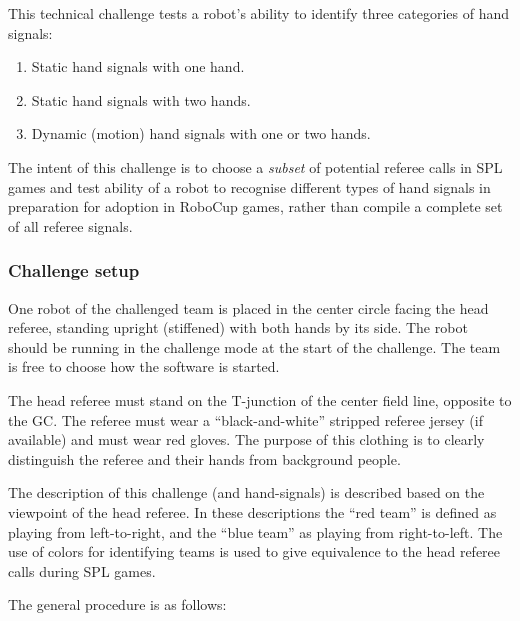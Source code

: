         This technical challenge tests a robot's ability to identify three categories of hand signals:
        \begin{enumerate}
            \item Static hand signals with one hand.
            \item Static hand signals with two hands.
            \item Dynamic (motion) hand signals with one or two hands.
        \end{enumerate}
        
        The intent of this challenge is to choose a \emph{subset} of potential referee calls in SPL games and test ability of a robot to recognise different types of hand signals in preparation for adoption in RoboCup games, rather than compile a complete set of all referee signals.

    \subsubsection{Challenge setup}

        One robot of the challenged team is placed in the center circle facing the head referee, standing upright (stiffened) with both hands by its side. The robot should be running in the challenge mode at the start of the challenge. The team is free to choose how the software is started.
        
        The head referee must stand on the T-junction of the center field line, opposite to the GC. The referee must wear a ``black-and-white'' stripped referee jersey (if available) and must  wear red gloves. The purpose of this clothing is to clearly distinguish the referee and their hands from background people. 
        
        The description of this challenge (and hand-signals) is described based on the viewpoint of the head referee. In these descriptions the ``red team'' is defined as playing from left-to-right, and the ``blue team'' as playing from right-to-left. The use of colors for identifying teams is used to give equivalence to the head referee calls during SPL games.
        
        The general procedure is as follows:


